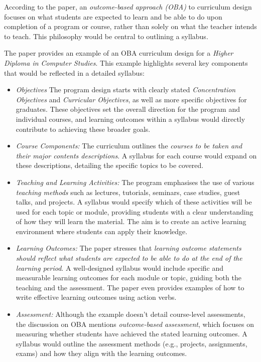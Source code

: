 \documentclass[11pt,a4paper]{article}
\begin{document}
	According to the paper, an \emph{outcome-based approach (OBA)} to curriculum design focuses on what students are expected to learn and be able to do upon completion of a program or course, rather than solely on what the teacher intends to teach. This philosophy would be central to outlining a syllabus.
	
	The paper provides an example of an OBA curriculum design for a \emph{Higher Diploma in Computer Studies}. This example highlights several key components that would be reflected in a detailed syllabus:
	
	\begin{itemize} 
	\item \emph{Objectives} The program design starts with clearly stated \emph{Concentration Objectives} and \emph{Curricular Objectives}, as well as more specific objectives for graduates. These objectives set the overall direction for the program and individual courses, and learning outcomes within a syllabus would directly contribute to achieving these broader goals.
	
	\item \emph{Course Components:} The curriculum outlines the \emph{courses to be taken and their major contents descriptions}. A syllabus for each course would expand on these descriptions, detailing the specific topics to be covered.
	
	\item \emph{Teaching and Learning Activities:} The program emphasises the use of various \emph{teaching methods} such as lectures, tutorials, seminars, case studies, guest talks, and projects. A syllabus would specify which of these activities will be used for each topic or module, providing students with a clear understanding of how they will learn the material. The aim is to create an active learning environment where students can apply their knowledge.
	
	\item \emph{Learning Outcomes:} The paper stresses that \emph{learning outcome statements should reflect what students are expected to be able to do at the end of the learning period}. A well-designed syllabus would include specific and measurable learning outcomes for each module or topic, guiding both the teaching and the assessment. The paper even provides examples of how to write effective learning outcomes using action verbs.
	
	\item \emph{Assessment:} Although the example doesn't detail course-level assessments, the discussion on OBA mentions \emph{outcome-based assessment}, which focuses on measuring whether students have achieved the stated learning outcomes. A syllabus would outline the assessment methods (e.g., projects, assignments, exams) and how they align with the learning outcomes.
	
	\end{itemize}
	
\end{document}

